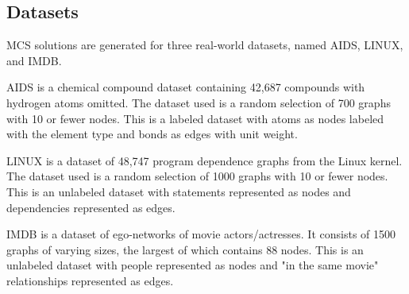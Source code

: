\subsection{Datasets}
MCS solutions are generated for three real-world datasets, named AIDS, LINUX, and IMDB.

AIDS is a chemical compound dataset containing 42,687 compounds with hydrogen atoms omitted. The dataset used is a random selection of 700 graphs with 10 or fewer nodes. This is a labeled dataset with atoms as nodes labeled with the element type and bonds as edges with unit weight.

LINUX \cite{wang2012efficient} is a dataset of 48,747 program dependence graphs from the Linux kernel. The dataset used is a random selection of 1000 graphs with 10 or fewer nodes. This is an unlabeled dataset with statements represented as nodes and dependencies represented as edges.

IMDB \cite{yanardag2015deep} is a dataset of ego-networks of movie actors/actresses. It consists of 1500 graphs of varying sizes, the largest of which contains 88 nodes. This is an unlabeled dataset with people represented as nodes and "in the same movie" relationships represented as edges.